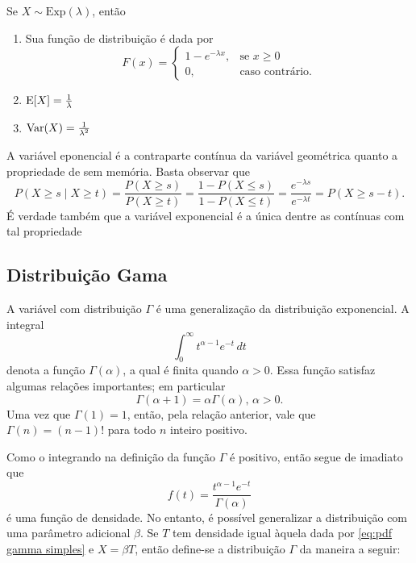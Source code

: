 \begin{prop:exponencial}
Se $X \sim \mathrm{Exp}(\lambda)$, então
\begin{enumerate}
\item Sua função de distribuição é dada por
\[
    F(x) = \begin{cases}
        1 - e^{-\lambda x},&\text{se } x \ge 0 \\
        0,&\text{caso contrário.}
    \end{cases}
\]
\item $\mathrm{E}\!\left[X\right] = \frac{1}{\lambda}$
\item $\mathrm{Var}\!\left(X\right) = \frac{1}{\lambda^2}$
\end{enumerate}
\end{prop:exponencial}

\begin{obs:exponencial 1}
A variável eponencial é a contraparte contínua da variável geométrica quanto a propriedade
de sem memória.
Basta observar que
\[
    P(X \ge s \mid X \ge t) =
    \frac{P(X \ge s)}{P(X \ge t)} =
    \frac{1 - P(X \le s)}{1 - P(X \le t)} =
    \frac{e^{-\lambda s}}{e^{-\lambda t}} =
    P(X \ge s - t).
\]
É verdade também que a variável exponencial é a única dentre as contínuas com tal propriedade
\end{obs:exponencial 1}

\subsection{Distribuição Gama}

A variável com distribuição $\Gamma$ é uma generalização da distribuição exponencial.
A integral
\[
   \int_0^\infty t^{\alpha - 1} e^{-t}\, dt
\]
denota a função $\Gamma(\alpha)$, a qual é finita quando $\alpha > 0$.
Essa função satisfaz algumas relações importantes; em particular
\[
    \Gamma(\alpha+1) = \alpha \Gamma(\alpha),\, \alpha > 0.
\]
Uma vez que $\Gamma(1) = 1$, então, pela relação anterior, vale que $\Gamma(n) = (n-1)!$ para
todo $n$ inteiro positivo.

Como o integrando na definição da função $\Gamma$ é positivo, então segue de imadiato
que
\begin{equation}
\label{eq:pdf gamma simples}
    f(t) = \frac{t^{\alpha-1}e^{-t}}{\Gamma(\alpha)}
\end{equation}
é uma função de densidade.
No entanto, é possível generalizar a distribuição com uma parâmetro adicional $\beta$.
Se $T$ tem densidade igual àquela dada por \ref{eq:pdf gamma simples} e $X = \beta T$,
então define-se a distribuição $\Gamma$ da maneira a seguir:

